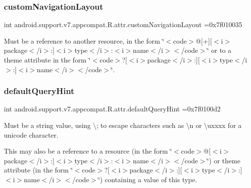 \subsubsection{\texorpdfstring{custom\+Navigation\+Layout}{customNavigationLayout}}
{\footnotesize\ttfamily int android.\+support.\+v7.\+appcompat.\+R.\+attr.\+custom\+Navigation\+Layout =0x7f010035\hspace{0.3cm}{\ttfamily [static]}}

Must be a reference to another resource, in the form \char`\"{}$<$code$>$@\mbox{[}+\mbox{]}\mbox{[}$<$i$>$package$<$/i$>$\+:\mbox{]}$<$i$>$type$<$/i$>$\+:$<$i$>$name$<$/i$>$$<$/code$>$\char`\"{} or to a theme attribute in the form \char`\"{}$<$code$>$?\mbox{[}$<$i$>$package$<$/i$>$\+:\mbox{]}\mbox{[}$<$i$>$type$<$/i$>$\+:\mbox{]}$<$i$>$name$<$/i$>$$<$/code$>$\char`\"{}. \mbox{\label{classandroid_1_1support_1_1v7_1_1appcompat_1_1R_1_1attr_a27da04996f4109d8ab6b9d161ca0a924}} 
\subsubsection{\texorpdfstring{default\+Query\+Hint}{defaultQueryHint}}
{\footnotesize\ttfamily int android.\+support.\+v7.\+appcompat.\+R.\+attr.\+default\+Query\+Hint =0x7f0100d2\hspace{0.3cm}{\ttfamily [static]}}

Must be a string value, using \textquotesingle{}\textbackslash{};\textquotesingle{} to escape characters such as \textquotesingle{}\textbackslash{}n\textquotesingle{} or \textquotesingle{}\textbackslash{}uxxxx\textquotesingle{} for a unicode character. 

This may also be a reference to a resource (in the form \char`\"{}$<$code$>$@\mbox{[}$<$i$>$package$<$/i$>$\+:\mbox{]}$<$i$>$type$<$/i$>$\+:$<$i$>$name$<$/i$>$$<$/code$>$\char`\"{}) or theme attribute (in the form \char`\"{}$<$code$>$?\mbox{[}$<$i$>$package$<$/i$>$\+:\mbox{]}\mbox{[}$<$i$>$type$<$/i$>$\+:\mbox{]}$<$i$>$name$<$/i$>$$<$/code$>$\char`\"{}) containing a value of this type. \mbox{\label{classandroid_1_1support_1_1v7_1_1appcompat_1_1R_1_1attr_a8d8cccb8f3afab5313a1361426709f21}} 
